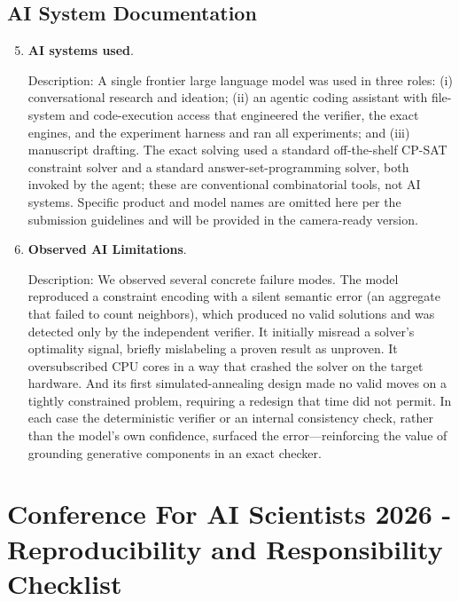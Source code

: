 \documentclass{article}
\begin{document}
\subsection*{AI System Documentation}

\begin{enumerate}
    \setcounter{enumi}{4}

    \item \textbf{AI systems used}.

    Description: A single frontier large language model was used in three roles: (i) conversational research and ideation; (ii) an agentic coding assistant with file-system and code-execution access that engineered the verifier, the exact engines, and the experiment harness and ran all experiments; and (iii) manuscript drafting. The exact solving used a standard off-the-shelf CP-SAT constraint solver and a standard answer-set-programming solver, both invoked by the agent; these are conventional combinatorial tools, not AI systems. Specific product and model names are omitted here per the submission guidelines and will be provided in the camera-ready version.

    \item \textbf{Observed AI Limitations}.

    Description: We observed several concrete failure modes. The model reproduced a constraint encoding with a silent semantic error (an aggregate that failed to count neighbors), which produced no valid solutions and was detected only by the independent verifier. It initially misread a solver's optimality signal, briefly mislabeling a proven result as unproven. It oversubscribed CPU cores in a way that crashed the solver on the target hardware. And its first simulated-annealing design made no valid moves on a tightly constrained problem, requiring a redesign that time did not permit. In each case the deterministic verifier or an internal consistency check, rather than the model's own confidence, surfaced the error---reinforcing the value of grounding generative components in an exact checker.

\end{enumerate}

\newpage

\section*{Conference For AI Scientists 2026 - Reproducibility and Responsibility Checklist}
\label{checklist_reproducibility}
\end{document}

